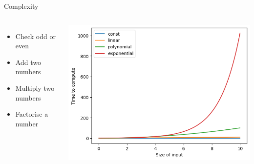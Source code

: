 \documentclass{beamer}
\begin{document}
\begin{frame}{Complexity}
    \begin{columns}
    \begin{itemize}
        \item Check odd or even\\
        \item Add two numbers \\
        \item Multiply two numbers \\
        \item Factorise a number \\
    \end{itemize}
    \includegraphics[width=\columnwidth]{images/complex3.png}
    \end{columns}
\end{frame}
\end{document}
